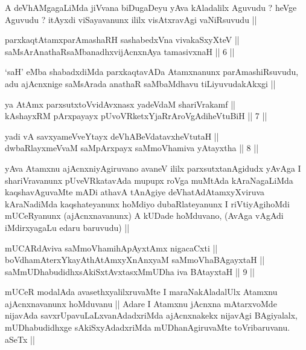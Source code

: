 \begin{artha}
A deVhAMgagaLiMda jiVvana biDugaDeyu yAva kAladalilx Aguvudu ? heVge
Aguvudu ? itAyxdi viSayavanunx ililx visAtxravAgi vaNiRsuvudu ||
\end{artha}

\begin{shl}
parxkaqtAtamxparAmashaRH sashabedxVna vivakaSxyXteV || \\
saMsArAnathaRsaMbanadhxvijAcnxnAya tamasivxnaH ||  6 ||  
\end{shl}

\begin{artha}
`saH' eMba shabadxdiMda parxkaqtavADa Atamxnanunx parAmashiRsuvudu,
  adu ajAcnxnige saMsArada anathaR saMbaMdhavu tiLiyuvudakAkxgi ||
\end{artha}

\begin{shl}
ya AtAmx parxsutxtoV\s vidAvxnasx yadeVdaM shariVrakamf || \\
kAshayxRM pArxpayayx pUvoVRketxYjaRrAroVgAdiheVtuBiH ||  7 ||  
\end{shl}
				
\begin{shl}
yadi vA savxyameVveYtayx deVhABeVdatavxheVtutaH || \\
dwbaRlayxmeVvaM saMpArxpayx saMmoVhamiva yAtayxtha ||  8 ||  
\end{shl}

\begin{artha}
yAva Atamxnu ajAcnxniyAgiruvano avaneV ililx parxsutxtanAgidudx yAvAga
I shariVravanunx pUveVRkatavAda mupupx roVga muMtAda kAraNagaLiMda
kaqshavAguvaMte mADi athavA tAnAgiye deVhatAdAtamxyXviruva kAraNadiMda
kaqshateyanunx hoMdiyo dubaRlateyanunx I riVtiyAgihoMdi mUCeRyanunx
(ajAcnxnavanunx) A kUDade hoMduvano,  (AvAga vAgAdi iMdirxyagaLu edaru
baruvudu) || 
\end{artha}

\begin{shl}
mUCARdAviva saMmoVhamihApAyxtAmx nigacaCxti || \\
boVdhamAterxYkayAthAtAmxyXnAnxyaM saMmoVhaBAgayxtaH ||  \\
saMmUDhabudidhxsAkiSxtAvxtasxMmUDha iva BAtayxtaH ||  9 ||  
\end{shl}

\begin{artha}
mUCeR modalAda avasethxyalilxruvaMte I maraNakAladalUlx Atamxnu
ajAcnxnavanunx hoMduvanu || Adare I Atamxnu jAcnxna mAtarxvoMde
nijavAda savxrUpavuLaLxvanAdadxriMda ajAcnxnakekx nijavAgi BAgiyalalx,
mUDhabudidhxge sAkiSxyAdadxriMda mUDhanAgiruvaMte toVribaruvanu. aSeTx ||
\end{artha}

